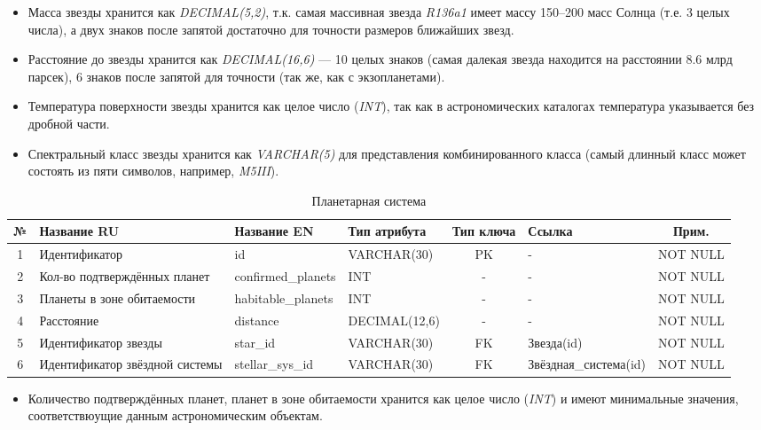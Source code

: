 \documentclass[14pt,a4paper]{extarticle}
\begin{document}
	\begin{itemize}
		\item Масса звезды хранится как \textit{DECIMAL(5,2)}, т.к. самая массивная звезда \textit{R136a1} имеет массу 150--200 масс Солнца (т.е. 3 целых числа), а двух знаков после запятой достаточно для точности размеров ближайших звезд.
		\item Расстояние до звезды хранится как \textit{DECIMAL(16,6)} --- 10 целых знаков (самая далекая звезда находится на расстоянии 8.6 млрд парсек), 6 знаков после запятой для точности (так же, как с экзопланетами).
		\item Температура поверхности звезды хранится как целое число (\textit{INT}), так как в
	астрономических каталогах температура указывается без дробной части.
		\item Спектральный класс звезды хранится как \textit{VARCHAR(5)} для представления
	комбинированного класса (самый длинный класс может состоять из пяти символов, например, \textit{M5III}).
	\end{itemize}

	\begin{table}[H]
		\centering
		\caption{Планетарная система}
		\small
\begin{tabular}{|c|p{3.2cm}|p{2.6cm}|p{2.8cm}|c|p{2.5cm}|c|}
\hline
№ & Название RU & Название EN & Тип атрибута & Тип ключа & Ссылка & Прим. \\
\hline
1 & Идентификатор & id & VARCHAR(30) & PK & - & NOT NULL \\
2 & Кол-во подтверждённых планет & confirmed_planets & INT & - & - & NOT NULL \\
3 & Планеты в зоне обитаемости & habitable_planets & INT & - & - & NOT NULL \\
4 & Расстояние & distance & DECIMAL(12,6) & - & - & NOT NULL \\
5 & Идентификатор звезды & star_id & VARCHAR(30) & FK & Звезда(id) & NOT NULL \\
6 & Идентификатор звёздной системы & stellar_sys_id & VARCHAR(30) & FK & Звёздная_система(id) & NOT NULL \\
\hline
\end{tabular}
	\end{table}

	\begin{itemize}
		\item Количество подтверждённых планет, планет в зоне обитаемости хранится как целое число (\textit{INT}) и имеют минимальные значения, соответствюущие данным астрономическим объектам.
	\end{itemize}
\end{document}
